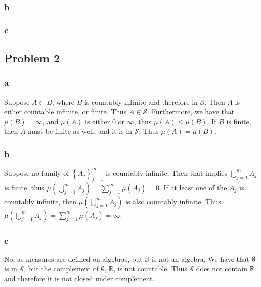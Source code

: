 \documentclass{article}
\theoremstyle{definition}
\numberwithin{theorem}{section}
\numberwithin{equation}{section}
\newcommand{\sig}{\mathcal{S}}
\begin{document}
\subsubsection{b}

\subsubsection{c}
\subsection{Problem 2}
\subsubsection{a}
Suppose $A \subset B$, where $B$ is countably infinite and therefore in $\sig$. Then $A$ is either countable infinite, or finite. Thus $A \in \sig$. Furthermore, we have that $\mu(B) = \infty$, and $\mu(A)$ is either $0$ or $\infty$, thus $\mu(A) \leq \mu(B)$. If $B$ is finite, then $A$ must be finite as well, and it is in $\sig$. Thus $\mu(A) = \mu(B)$.
\subsubsection{b}
Suppose no family of $\left\lbrace A_j \right\rbrace_{j = 1}^m$ is countably infinite. Then that implies $\bigcup_{j = 1}^m A_j$ is finite, thus $\mu(\bigcup_{j = 1}^m A_j) = \sum_{j = 1}^m \mu(A_j) = 0$. If at least one of the $A_j$ is countably infinite, then $\mu(\bigcup_{j = 1}^m A_j)$ is also countably infinite. Thus $\mu(\bigcup_{j = 1}^m A_j) = \sum_{j = 1}^m \mu(A_j) = \infty$.
\subsubsection{c}
No, as measures are defined on algebras, but $\sig$ is not an algebra. We have that $\emptyset$ is in $\sig$, but the complement of $\emptyset$, $\mathbb{R}$, is not countable. Thus $\sig$ does not contain $\mathbb{R}$ and therefore it is not closed under complement.
\end{document}
